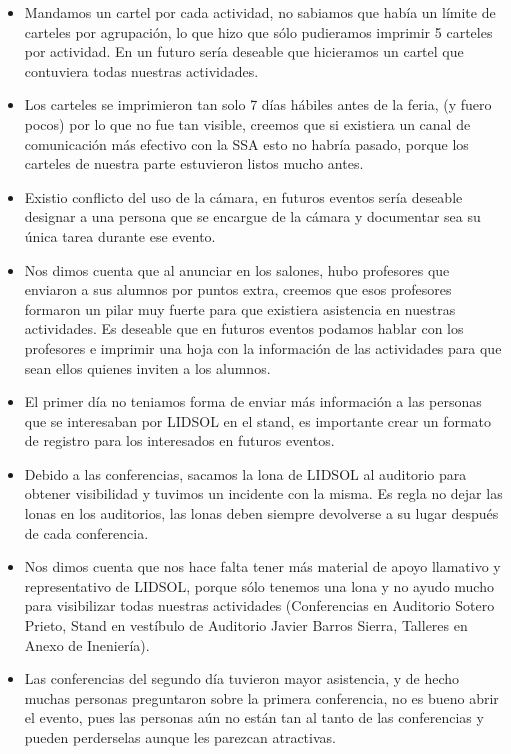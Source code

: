 \documentclass[a4paper,11pt]{article}                 %
\begin{document}
\begin{itemize}
    
    \item Mandamos un cartel por cada actividad, no sabiamos que había un límite de carteles por agrupación, lo que hizo que sólo pudieramos imprimir 5 carteles por actividad. En un futuro sería deseable que hicieramos un cartel que contuviera todas nuestras actividades.
    
    \item Los carteles se imprimieron tan solo 7 días hábiles antes de la feria, (y fuero pocos) por lo que no fue tan visible, creemos que si existiera un canal de comunicación más efectivo con la SSA esto no habría pasado, porque los carteles de nuestra parte estuvieron listos mucho antes.
    
    \item Existio conflicto del uso de la cámara, en futuros eventos sería deseable designar a una persona que se encargue de la cámara y documentar sea su única tarea durante ese evento.
    
    \item Nos dimos cuenta que al anunciar en los salones, hubo profesores que enviaron a sus alumnos por puntos extra, creemos que esos profesores formaron un pilar muy fuerte para que existiera asistencia en nuestras actividades. Es deseable que en futuros eventos podamos hablar con los profesores e imprimir una hoja con la información de las actividades para que sean ellos quienes inviten a los alumnos.
    
    \item El primer día no teniamos forma de enviar más información a las personas que se interesaban por LIDSOL en el stand, es importante crear un formato de registro para los interesados en futuros eventos.
    
    \item Debido a las conferencias, sacamos la lona de LIDSOL al auditorio para obtener visibilidad y tuvimos un incidente con la misma. Es regla no dejar las lonas en los auditorios, las lonas deben siempre devolverse a su lugar después de cada conferencia.
    
    \item Nos dimos cuenta que nos hace falta tener más material de apoyo llamativo y representativo de LIDSOL, porque sólo tenemos una lona y no ayudo mucho para visibilizar todas nuestras actividades (Conferencias en Auditorio Sotero Prieto, Stand en vestíbulo de Auditorio Javier Barros Sierra, Talleres
 en Anexo de Ineniería).
     
    \item Las conferencias del segundo día tuvieron mayor asistencia, y de hecho muchas personas preguntaron sobre la primera conferencia, no es bueno abrir el evento, pues las personas aún no están tan al tanto de las conferencias y pueden perderselas aunque les parezcan atractivas.
    

\end{itemize}
\end{document}
